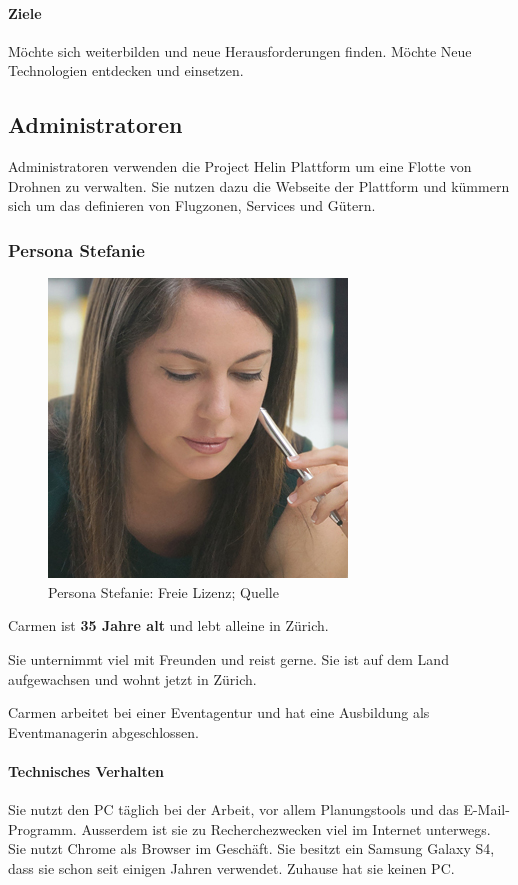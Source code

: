 \paragraph{Ziele} 

Möchte sich weiterbilden und neue Herausforderungen finden. Möchte Neue Technologien entdecken und einsetzen.\\

\subsection{Administratoren}

Administratoren verwenden die Project Helin Plattform um eine Flotte von Drohnen zu verwalten. Sie nutzen dazu die Webseite der Plattform und kümmern sich um das definieren von Flugzonen, Services und Gütern.

\subsubsection{Persona Stefanie}
\begin{figure}
	\includegraphics[width=.35\textwidth]{images/persona-stefanie.jpg} 
	\caption{Persona Stefanie: Freie Lizenz; Quelle} %
	\label{fig:stefanie}
\end{figure}


Carmen ist \textbf{35 Jahre alt} und lebt alleine in Zürich.

Sie unternimmt viel mit Freunden und reist gerne. Sie ist auf dem Land aufgewachsen und wohnt jetzt in Zürich. 

Carmen arbeitet bei einer Eventagentur und hat eine Ausbildung als Eventmanagerin abgeschlossen.

\paragraph{Technisches Verhalten} 
Sie nutzt den PC täglich bei der Arbeit, vor allem Planungstools und das E-Mail-Programm. Ausserdem ist sie zu Recherchezwecken viel im Internet unterwegs. Sie nutzt Chrome als Browser im Geschäft. Sie besitzt ein Samsung Galaxy S4, dass sie schon seit einigen Jahren verwendet. Zuhause hat sie keinen PC.

